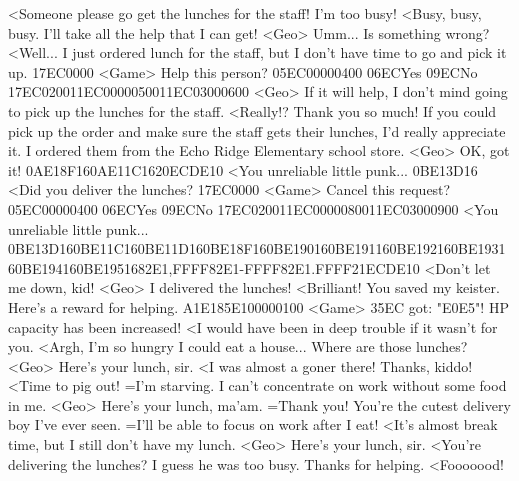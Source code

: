 <Someone please go get the lunches for the staff! I'm too busy! 
<Busy, busy, busy. 
I'll take all the help that I can get! 
<Geo> Umm... 
Is something wrong? 
<Well... 
I just ordered lunch for the staff, but I don't have time to go and pick it up. 
{17}{EC}{00}{00} 
<Game> Help this person? {05}{EC}{00}{00}{04}{00}  {06}{EC}Yes   {09}{EC}No 
{17}{EC}{02}{00}{11}{EC}{00}{00}{05}{00}{11}{EC}{03}{00}{06}{00}
<Geo> If it will help, I don't mind going to pick up the lunches for the staff. 
<Really!? Thank you so much! 
If you could pick up the order and make sure the 
staff gets their lunches, I'd really appreciate it. 
I ordered them from the Echo Ridge Elementary school store. 
<Geo> OK, got it! 
{0A}{E1}{8F}{16}{0A}{E1}{1C}{16}{20}{EC}{DE}{10}
<You unreliable little punk... 
{0B}{E1}{3D}{16}
<Did you deliver the lunches? 
{17}{EC}{00}{00} 
<Game> Cancel this request? {05}{EC}{00}{00}{04}{00}  {06}{EC}Yes   {09}{EC}No 
{17}{EC}{02}{00}{11}{EC}{00}{00}{08}{00}{11}{EC}{03}{00}{09}{00}
<You unreliable little punk... 
{0B}{E1}{3D}{16}{0B}{E1}{1C}{16}{0B}{E1}{1D}{16}{0B}{E1}{8F}{16}{0B}{E1}{90}{16}{0B}{E1}{91}{16}{0B}{E1}{92}{16}{0B}{E1}{93}{16}{0B}{E1}{94}{16}{0B}{E1}{95}{16}{82}{E1},{FF}{FF}{82}{E1}-{FF}{FF}{82}{E1}.{FF}{FF}{21}{EC}{DE}{10}
<Don't let me down, kid! 
<Geo> I delivered the lunches! 
<Brilliant! You saved my keister. 
Here's a reward for helping. 
{A1}{E1}{85}{E1}{00}{00}{01}{00} 
<Game> {35}{EC} got: "{E0}{E5}"! 
HP capacity has been increased! 
<I would have been in deep trouble if it wasn't for you. 
<Argh, I'm so hungry I could eat a house... 
Where are those lunches? 
<Geo> Here's your lunch, sir. 
<I was almost a goner there! 
Thanks, kiddo! 
<Time to pig out! 
=I'm starving. 
I can't concentrate on work without some food in me. 
<Geo> Here's your lunch, ma'am. 
=Thank you! 
You're the cutest delivery boy I've ever seen. 
=I'll be able to focus on work after I eat! 
<It's almost break time, but I still don't have my lunch. 
<Geo> Here's your lunch, sir. 
<You're delivering the lunches? 
I guess he was too busy. 
Thanks for helping. 
<Fooooood! 

